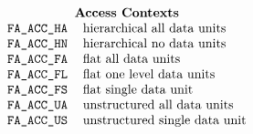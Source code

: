 
\normalsize
\[\begin{tabular}{rl}
    \multicolumn{2}{c}{\bf Access Contexts}\\
    \tt FA\_ACC\_HA&		hierarchical all data units\\
    \tt FA\_ACC\_HN&		hierarchical no data units\\
    \tt FA\_ACC\_FA&		flat all data units\\
    \tt FA\_ACC\_FL&		flat one level data units\\
    \tt FA\_ACC\_FS&		flat single data unit\\
    \tt FA\_ACC\_UA&		unstructured all data units\\
    \tt FA\_ACC\_US&		unstructured single data unit\\
\end{tabular}\]
